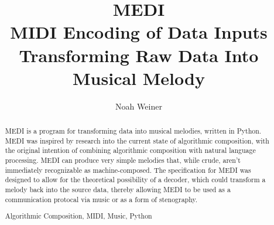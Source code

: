 \documentclass[runningheads,a4paper]{llncs}
\newcommand{\keywords}[1]{\par\addvspace\baselineskip
\noindent\keywordname\enspace\ignorespaces#1}
\begin{document}
\mainmatter  %

\title{MEDI\\
MIDI Encoding of Data Inputs\\
Transforming Raw Data Into Musical Melody}


%
%
\author{Noah Weiner}
%


%
%

\maketitle


\begin{abstract}
MEDI is a program for transforming data into musical melodies, written in
Python. MEDI was inspired by research into the current state of algorithmic
composition, with the original intention of combining algorithmic composition
with natural language processing. MEDI can produce very simple melodies that,
while crude, aren't immediately recognizable as machine-composed. The
specification for MEDI was designed to allow for the theoretical possibility of
a decoder, which could transform a melody back into the source data, thereby
allowing MEDI to be used as a communication protocal via music or as a form of
stenography.
\keywords{Algorithmic Composition, MIDI, Music, Python}
\end{abstract}
\end{document}
